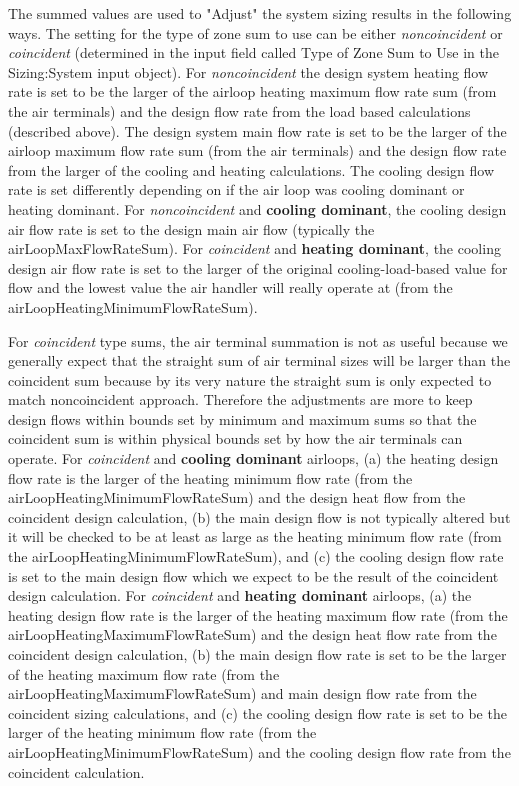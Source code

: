  The summed values are used to "Adjust" the system sizing results in the following ways.  The setting for the type of zone sum to use can be either \emph{noncoincident} or \emph{coincident} (determined in the input field called Type of Zone Sum to Use in the Sizing:System input object).  For \emph{noncoincident} the design system heating flow rate is set to be the larger of the airloop heating maximum flow rate sum (from the air terminals) and the design flow rate from the load based calculations (described above).  The design system main flow rate is set to be the larger of the airloop maximum flow rate sum (from the air terminals) and the design flow rate from the larger of the cooling and heating calculations. The cooling design flow rate is set differently depending on if the air loop was cooling dominant or heating dominant.  For \emph{noncoincident} and \textbf{cooling dominant}, the cooling design air flow rate is set to the design main air flow (typically the airLoopMaxFlowRateSum). For \emph{coincident} and \textbf{heating dominant}, the cooling design air flow rate is set to the larger of the original cooling-load-based value for flow and the lowest value the air handler will really operate at (from the airLoopHeatingMinimumFlowRateSum).  
 
 For \emph{coincident} type sums, the air terminal summation is not as useful because we generally expect that the straight sum of air terminal sizes will be larger than the coincident sum because by its very nature the straight sum is only expected to match noncoincident approach.  Therefore the adjustments are more to keep design flows within bounds set by minimum and maximum sums so that the coincident sum is within physical bounds set by how the air terminals can operate.  For \emph{coincident} and \textbf{cooling dominant} airloops,  (a) the heating design flow rate is the larger of the heating minimum flow rate (from the airLoopHeatingMinimumFlowRateSum) and the design heat flow from the coincident design calculation, (b) the main design flow is not typically altered but it will be checked to be at least as large as the heating minimum flow rate (from the airLoopHeatingMinimumFlowRateSum), and (c) the cooling design flow rate is set to the main design flow which we expect to be the result of the coincident design calculation.  For \emph{coincident} and \textbf{heating dominant} airloops, (a) the heating design flow rate is the larger of the heating maximum flow rate (from the airLoopHeatingMaximumFlowRateSum) and the design heat flow rate from the coincident design calculation, (b) the main design flow rate is set to be the larger of the heating maximum flow rate (from the airLoopHeatingMaximumFlowRateSum) and main design flow rate from the coincident sizing calculations, and (c) the cooling design flow rate is set to be the larger of the heating minimum flow rate (from the airLoopHeatingMinimumFlowRateSum) and the cooling design flow rate from the coincident calculation. 
 
